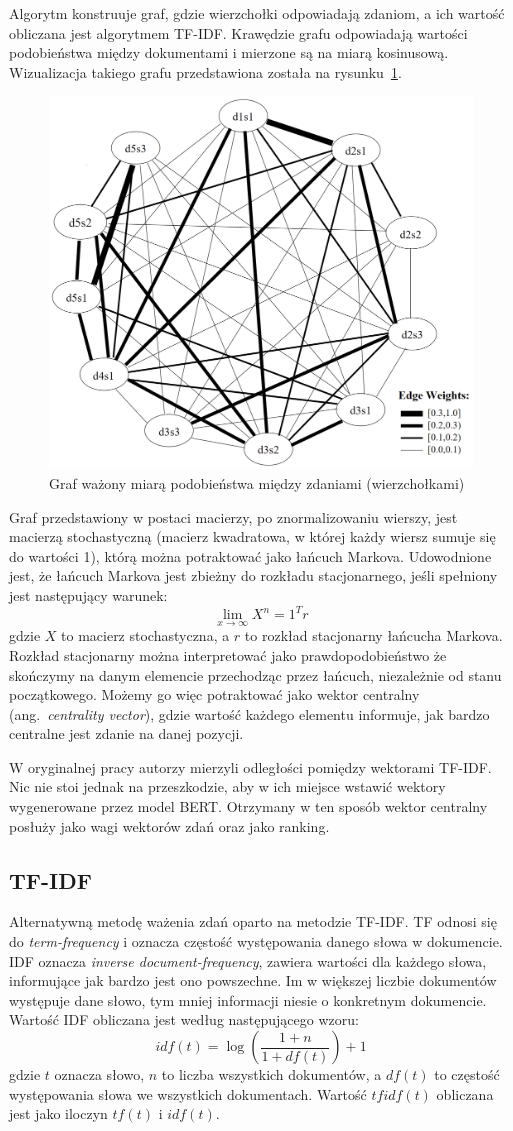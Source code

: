 		Algorytm konstruuje graf, gdzie wierzchołki odpowiadają zdaniom, a ich wartość obliczana jest algorytmem TF-IDF\@.
		Krawędzie grafu odpowiadają wartości podobieństwa między dokumentami i mierzone są na miarą kosinusową.
		Wizualizacja takiego grafu przedstawiona została na rysunku~\ref{fig:lexrank}.
		\begin{figure}[ht]
			\centering
			\includegraphics[width=0.5\linewidth]{rys03/lexrank.png}
			\caption{Graf ważony miarą podobieństwa między zdaniami (wierzchołkami)\cite{LexRank}}\label{fig:lexrank}
		\end{figure}
		Graf przedstawiony w postaci macierzy, po znormalizowaniu wierszy, jest macierzą stochastyczną
			(macierz kwadratowa, w której każdy wiersz sumuje się do wartości 1), którą można potraktować jako łańcuch Markova.
		Udowodnione jest, że łańcuch Markova jest zbieżny do rozkładu stacjonarnego, jeśli spełniony jest następujący warunek:
		\[\lim_{x \to \infty}X^n = 1^T r\]
		gdzie \(X\) to macierz stochastyczna, a \(r\) to rozkład stacjonarny łańcucha Markova.
		Rozkład stacjonarny można interpretować jako prawdopodobieństwo że skończymy na danym elemencie przechodząc przez łańcuch, niezależnie od stanu początkowego.
		Możemy go więc potraktować jako wektor centralny (ang.\ \emph{centrality vector}),
			gdzie wartość każdego elementu informuje, jak bardzo centralne jest zdanie na danej pozycji.

		W oryginalnej pracy autorzy mierzyli odległości pomiędzy wektorami TF-IDF\@.
		Nic nie stoi jednak na przeszkodzie, aby w ich miejsce wstawić wektory wygenerowane przez model BERT\@.
		Otrzymany w ten sposób wektor centralny posłuży jako wagi wektorów zdań oraz jako ranking.

	\subsection{TF-IDF}
		Alternatywną metodę ważenia zdań oparto na metodzie TF-IDF\@.
		TF odnosi się do \emph{term-frequency} i oznacza częstość występowania danego słowa w dokumencie.
		IDF oznacza \emph{inverse document-frequency}, zawiera wartości dla każdego słowa, informujące jak bardzo jest ono powszechne.
		Im w większej liczbie dokumentów występuje dane słowo, tym mniej informacji niesie o konkretnym dokumencie.
		Wartość IDF obliczana jest według następującego wzoru:
		\[idf(t)=\log\left(\frac{1+n}{1+df(t)}\right) + 1\]
		gdzie \(t\) oznacza słowo, \(n\) to liczba wszystkich dokumentów, a \(df(t)\) to częstość występowania słowa we wszystkich dokumentach.
		Wartość \(tfidf(t)\) obliczana jest jako iloczyn \(tf(t)\) i \(idf(t)\).
		
